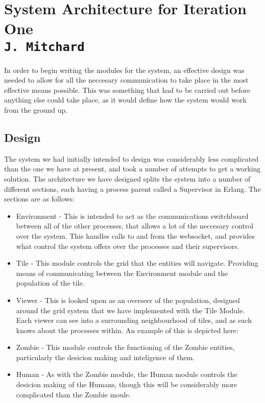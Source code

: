 \pagestyle{empty}

\section{System Architecture for Iteration One\\{\small\tt{J.~Mitchard}}}

\begin{description}
In order to begin writing the modules for the system, an effective design was needed to allow for all the neccesary communication to take place in the most effective means possible. This was something that had to be carried out before anything else could take place, as it would define how the system would work from the ground up.
\end{description}
\subsection{Design}
The system we had initially intended to design was considerably less complicated than the one we have at present, and took a number of attempts to get a working solution. The architecture we have designed splits the system into a number of different sections, each having a process parent called a Supervisor in Erlang. The sections are as follows:
\begin{itemize}
\item Environment - This is intended to act as the communications switchboard between all of the other processes, that allows a lot of the neccesary control over the system. This handles calls to and from the websocket, and provides what control the system offers over the processes and their supervisors.
\item Tile - This module controls the grid that the entities will navigate. Providing means of communicating between the Environment module and the population of the tile.
\item Viewer - This is looked upon as an overseer of the population, designed around the grid system that we have implemented with the Tile Module. Each viewer can see into a surrounding neighbourhood of tiles, and as such knows about the processes within. An example of this is depicted here: %
\item Zombie - This module controls the functioning of the Zombie entities, particularly the desicion making and inteligence of them.
\item Human - As with the Zombie module, the Human module controls the desicion making of the Humans, though this will be considerably more complicated than the Zombie moule.
\end{itemize}


